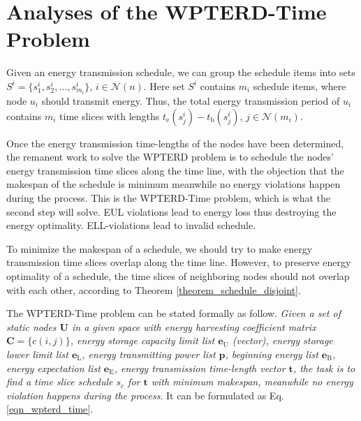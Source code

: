 \documentclass[journal,10pt]{IEEEtran}
\begin{document}
\section{Analyses of the WPTERD-Time Problem}
\label{sec_wpter_time}
Given an energy transmission schedule, we can group the schedule items into sets $S^{i}{=}\{s^{i}_1, s^{i}_2, \ldots, s^{i}_{m_i}\}$, $i{\in}\mathcal{N}(n)$. Here set $S^{i}$ contains $m_i$ schedule items, where node $u_i$ should transmit energy. Thus, the total energy transmission period of $u_i$ contains $m_i$ time slices with lengths $t_\text{e}(s^{i}_j){-}t_\text{b}(s^{i}_j)$, $j{\in}\mathcal{N}(m_i)$.

Once the energy transmission time-lengths of the nodes have been determined, the remanent work to solve the WPTERD problem is to schedule the nodes' energy transmission time slices along the time line, with the objection that the makespan of the schedule is minimum meanwhile no energy violations happen during the process. This is the WPTERD-Time problem, which is what the second step will solve. EUL violations lead to energy loss thus destroying the energy optimality. ELL-violations lead to invalid schedule.

To minimize the makespan of a schedule, we should try to make energy transmission time slices overlap along the time line. However, to preserve energy optimality of a schedule, the time slices of neighboring nodes should not overlap with each other, according to Theorem \ref{theorem_schedule_disjoint}.

The WPTERD-Time problem can be stated formally as follow. \textit{Given a set of static nodes $\textbf{U}$ in a given space with energy harvesting coefficient matrix $\mathbf{C}{=}\{c(i,j)\}$, energy storage capacity limit list $\textbf{e}_\text{U}$ (vector), energy storage lower limit list $\textbf{e}_\text{L}$, energy transmitting power list $\textbf{p}$, beginning energy list $\textbf{e}_\text{B}$, energy expectation list $\textbf{e}_\text{E}$, energy transmission time-length vector $\textbf{t}$, the task is to find a time slice schedule $s_c$ for $\textbf{t}$ with minimum makespan, meanwhile no energy violation happens during the process}. It can be formulated as Eq.\eqref{eqn_wpterd_time}.
\end{document}
